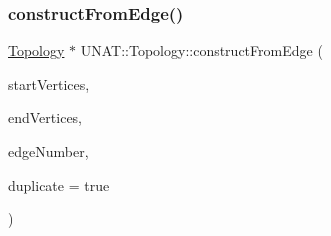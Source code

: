 \mbox{\label{classUNAT_1_1Topology_a9765061db14035b0f624872d6855c470}} 
\subsubsection{\texorpdfstring{constructFromEdge()}{constructFromEdge()}\hspace{0.1cm}{\footnotesize\ttfamily [3/3]}}
{\footnotesize\ttfamily \mbox{\hyperlink{classUNAT_1_1Topology}{Topology}} $\ast$ U\+N\+A\+T\+::\+Topology\+::construct\+From\+Edge (\begin{DoxyParamCaption}\item[{\mbox{\hyperlink{include_2swMacro_8h_a113cf5f6b5377cdf3fac6aa4e443e9aa}{sw\+Int}} $\ast$}]{start\+Vertices,  }\item[{\mbox{\hyperlink{include_2swMacro_8h_a113cf5f6b5377cdf3fac6aa4e443e9aa}{sw\+Int}} $\ast$}]{end\+Vertices,  }\item[{\mbox{\hyperlink{include_2swMacro_8h_a113cf5f6b5377cdf3fac6aa4e443e9aa}{sw\+Int}}}]{edge\+Number,  }\item[{bool}]{duplicate = {\ttfamily true} }\end{DoxyParamCaption})\hspace{0.3cm}{\ttfamily [static]}}

